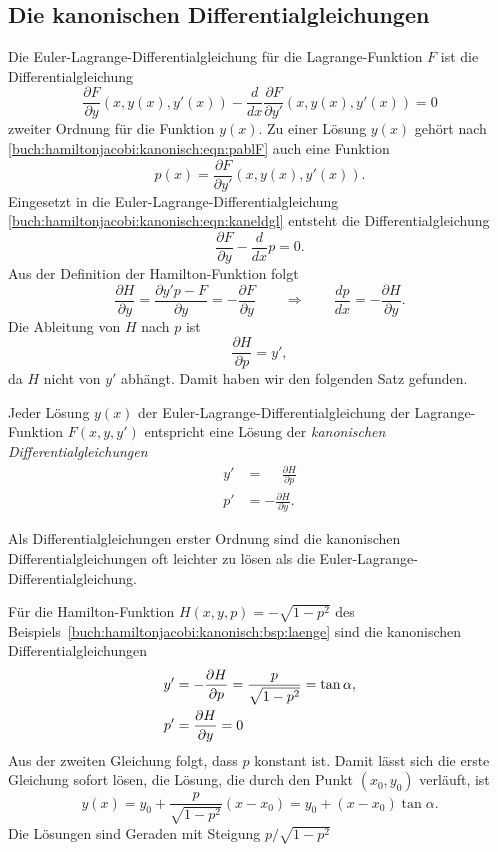 %
%
\subsection{Die kanonischen Differentialgleichungen}
Die Euler-Lagrange-Differentialgleichung für die Lagrange-Funktion $F$ ist 
die Differentialgleichung
\begin{equation}
\frac{\partial F}{\partial y}(x,y(x),y'(x))
-
\frac{d}{dx}
\frac{\partial F}{\partial y'}(x,y(x),y'(x))
=
0
\label{buch:hamiltonjacobi:kanonisch:eqn:kaneldgl}
\end{equation}
zweiter Ordnung für die Funktion $y(x)$.
Zu einer Lösung $y(x)$ gehört nach
\eqref{buch:hamiltonjacobi:kanonisch:eqn:pablF}
auch eine Funktion
\[
p(x)
=
\frac{\partial F}{\partial y'}(x,y(x),y'(x)).
\]
Eingesetzt in die Euler-Lagrange-Differentialgleichung
\eqref{buch:hamiltonjacobi:kanonisch:eqn:kaneldgl}
entsteht die Differentialgleichung
\[
\frac{\partial F}{\partial y}
-
\frac{d}{dx}p
=
0.
\]
Aus der Definition der Hamilton-Funktion folgt
\[
\frac{\partial H}{\partial y}
=
\frac{\partial y'p-F}{\partial y}
=
-\frac{\partial F}{\partial y}
\qquad\Rightarrow\qquad
\frac{dp}{dx}
=
-
\frac{\partial H}{\partial y}.
\]
Die Ableitung von $H$ nach $p$ ist
\[
\frac{\partial H}{\partial p}
=
y',
\]
da $H$ nicht von $y'$ abhängt.
Damit haben wir den folgenden Satz gefunden.

\begin{satz}
Jeder Lösung $y(x)$ der Euler-Lagrange-Differentialgleichung der
Lagrange-Funktion $F(x,y,y')$ entspricht eine Lösung
der {\em kanonischen Differentialgleichungen}
\begin{equation}
\begin{aligned}
y'&=\phantom{-}\frac{\partial H}{\partial p}
\\
p'&=-\frac{\partial H}{\partial y}.
\end{aligned}
\end{equation}
\end{satz}

Als Differentialgleichungen erster Ordnung sind die kanonischen
Differentialgleichungen oft leichter zu lösen als die
Euler-Lagrange-Differentialgleichung.

\begin{beispiel}
Für die Hamilton-Funktion 
$H(x,y,p) = -\sqrt{1-p^2}$
des Beispiels~\ref{buch:hamiltonjacobi:kanonisch:bsp:laenge} sind
die kanonischen Differentialgleichungen
\begin{align}
y'
&=
-\frac{\partial H}{\partial p}
=
\frac{p}{\sqrt{1-p^2}} = \tan\alpha,
\notag
\\
p'
&=
\frac{\partial H}{\partial y}=0
\notag
\end{align}
Aus der zweiten Gleichung folgt, dass $p$ konstant ist.
Damit lässt sich die erste Gleichung sofort lösen, die Lösung, die
durch den Punkt $(x_0,y_0)$ verläuft, ist
\[
y(x)
=
y_0+\frac{p}{\sqrt{1-p^2}}(x-x_0)
=
y_0+ (x-x_0) \tan\alpha.
\]
Die Lösungen sind Geraden mit Steigung $p/\sqrt{1-p^2}$
\end{beispiel}

